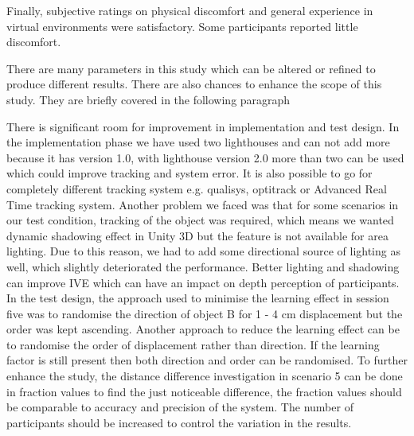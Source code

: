 Finally, subjective ratings on physical discomfort and general experience in virtual environments were satisfactory. Some participants reported little discomfort. \par

There are many parameters in this study which can be altered or refined to produce different results. There are also chances to enhance the scope of this study. They are briefly covered in the following paragraph\par
There is significant room for improvement in implementation and test design. In the implementation phase we have used two lighthouses and can not add more because it has version 1.0,  with lighthouse version 2.0 more than two can be used which could improve tracking and system error.  It is also possible to go for completely different tracking system e.g. qualisys, optitrack or Advanced Real Time tracking system. Another problem we faced was that for some scenarios in our test condition, tracking of the object was required, which means we wanted dynamic shadowing effect in Unity 3D but the feature is not available for area lighting. Due to this reason, we had to add some directional source of lighting as well, which slightly deteriorated the performance. Better lighting and shadowing can improve IVE which can have an impact on depth perception of participants.  
In the test design, the approach used to minimise the learning effect in session five was to randomise the direction of object B for 1 - 4 cm displacement but the order was kept ascending. Another approach to reduce the learning effect can be to randomise the order of displacement rather than direction. If the learning factor is still present then both direction and order can be randomised.      
To further enhance the study, the distance difference investigation in scenario 5 can be done in fraction values to find the just noticeable difference, the fraction values should be comparable to accuracy and precision of the system. The number of participants should be increased to control the variation in the results.     










